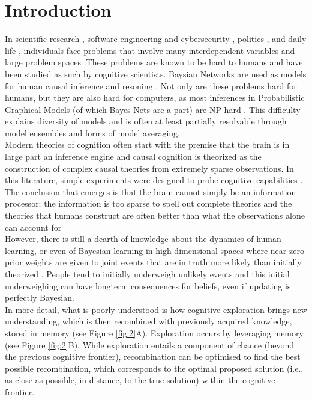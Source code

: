 \section{Introduction}
In scientific research \cite{hisano2013challenges}, software engineering and cybersecurity \cite{littlewood1989predicting,maillart2017given}, politics \cite{clinton2014hard}, and daily life \cite{gerson1986hard}, individuals face problems that involve many interdependent variables and large problem spaces \cite{koller09, Pearl2009CMR}.These problems are known to be hard to humans and have been studied as such by cognitive scientists. Baysian Networks are used as models for human causal inference and resoning \cite{bramley2015staying, castnerForthcoming, Griffiths2008, Pearl88, Spiegler2016, spiegler2015}. Not only are these problems hard for humans, but they are also hard for computers, as most inferences in Probabilistic Graphical Models (of which Bayes Nets are a part) are NP hard \cite{koller09}. This difficulty explains diversity of models and is often at least partially resolvable through model ensembles and forms of model averaging.\\ 

Modern theories of cognition often start with the premise that the brain is in large part an inference engine \cite{Tenenbaum06theory-basedbayesian} and causal cognition is theorized as the construction of complex causal theories from extremely sparse observations. In this literature, simple experiments were designed to probe cognitive capabilities \cite{tenenbaum2001structure}. The conclusion that emerges is that the brain cannot simply be an information processor; the information is too sparse to spell out complete theories and the theories that humans construct are often better than what the observations alone can account for \cite{ortoleva2012modeling, Hong04} \\

However, there is still a dearth of knowledge about the dynamics of human learning, or even of Bayesian learning in high dimensional spaces where near zero prior weights are given to joint events that are in truth more likely than initially theorized \cite{ortoleva2012modeling}. People tend to initially underweigh unlikely events \cite{taleb2007} and this initial underweighing can have longterm consequences for beliefs, even if updating is perfectly Bayesian.\\

In more detail, what is poorly understood is how cognitive exploration brings new understanding, which is then recombined with previously acquired knowledge, stored in memory (see Figure \ref{fig:2}A). Exploration occurs by leveraging memory (see Figure \ref{fig:2}B). While exploration entails a component of chance (beyond the previous cognitive frontier), recombination can be optimised to find the best possible recombination, which corresponds to the optimal proposed solution (i.e., as close as possible, in distance, to the true solution) within the cognitive frontier.\\

